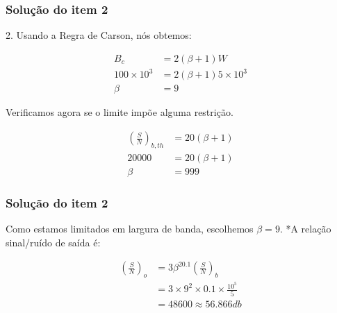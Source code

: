 \documentclass{beamer}
\begin{document}
\begin{frame}
  \frametitle{Solução do item 2}

  2. Usando a Regra de Carson, nós obtemos: 

\begin{align*}
B_c &= 2(\beta+1)W \\
100 \times 10^3 &= 2(\beta+1)5 \times 10^3 \\
\beta &= 9
\end{align*}

Verificamos agora se o limite impõe alguma restrição. 

\begin{align*}
\left(\frac{S}{N}\right)_{b,th} & = 20(\beta +1)\\
20000&= 20(\beta +1)\\
\beta &= 999
\end{align*} 

\end{frame}

\begin{frame}
  \frametitle{Solução do item 2}

  Como estamos limitados em largura de banda, escolhemos $\beta = 9$. *A relação sinal/ruído de saída é: 

\begin{align*}
\left(\frac{S}{N}\right)_{o} &= 3\beta^20.1\left(\frac{S}{N}\right)_{b}\\
&= 3 \times 9^2 \times0.1 \times \frac{10^5}{5}\\
&= 48600 \approx 56.866 db
\end{align*}

\end{frame}
\end{document}

